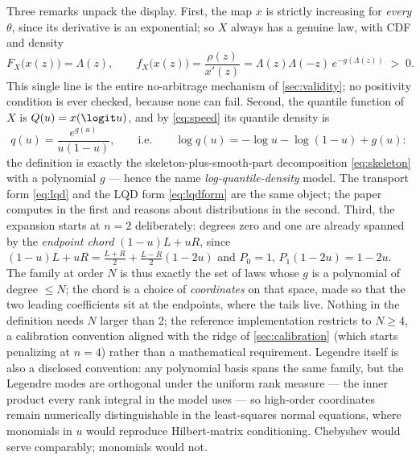 Three remarks unpack the display.  First, the map $x$ is strictly
increasing for \emph{every} $\theta$, since its derivative is an
exponential; so $X$ always has a genuine law, with CDF and density
\begin{equation}
F_X\big(x(z)\big)=\Lambda(z),
\qquad
f_X\big(x(z)\big)=\frac{\rho(z)}{x'(z)}
=\Lambda(z)\Lambda(-z)\,e^{-g(\Lambda(z))}\;>\;0 .
\label{eq:density}
\end{equation}
This single line is the entire no-arbitrage mechanism of
\cref{sec:validity}; no positivity condition is ever checked, because none
can fail.  Second, the quantile function of $X$ is $Q(u)=x(\logit u)$, and
by \eqref{eq:speed} its quantile density is
\begin{equation}
q(u)=\frac{e^{g(u)}}{u(1-u)},
\qquad\text{i.e.}\qquad
\log q(u)=-\log u-\log(1-u)+g(u):
\label{eq:lqdform}
\end{equation}
the definition is exactly the skeleton-plus-smooth-part decomposition
\eqref{eq:skeleton} with a polynomial $g$ --- hence the name
\emph{log-quantile-density} model.  The transport form \eqref{eq:lqd} and
the LQD form \eqref{eq:lqdform} are the same object; the paper computes in
the first and reasons about distributions in the second.  Third, the
expansion starts at $n=2$ deliberately: degrees zero and one are already
spanned by the \emph{endpoint chord} $(1-u)L+uR$, since
$(1-u)L+uR=\frac{L+R}{2}+\frac{L-R}{2}(1-2u)$ and $P_0=1$, $P_1(1-2u)=1-2u$.
The family at order $N$ is thus exactly the set of laws whose $g$ is a
polynomial of degree $\le N$; the chord is a choice of \emph{coordinates}
on that space, made so that the two leading coefficients sit at the
endpoints, where the tails live.  Nothing in the definition needs $N$
larger than $2$; the reference implementation restricts to $N\ge4$, a
calibration convention aligned with the ridge of \cref{sec:calibration}
(which starts penalizing at $n=4$) rather than a mathematical
requirement.  Legendre itself is also a disclosed convention: any
polynomial basis spans the same family, but the Legendre modes are
orthogonal under the uniform rank measure --- the inner product every
rank integral in the model uses --- so high-order coordinates remain
numerically distinguishable in the least-squares normal equations,
where monomials in $u$ would reproduce Hilbert-matrix conditioning.
Chebyshev would serve comparably; monomials would not.

